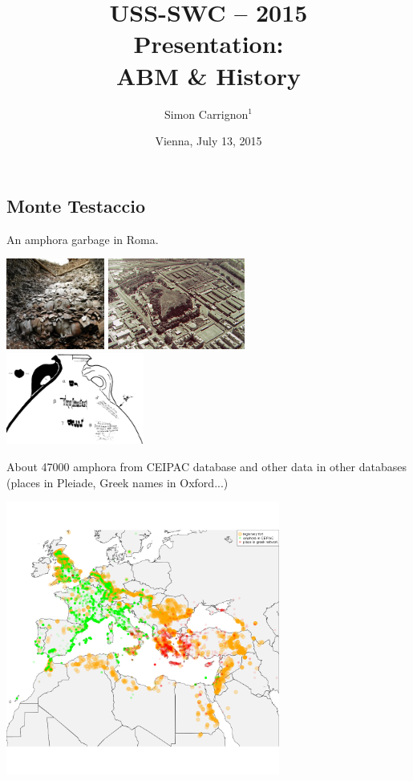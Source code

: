 \documentclass[final]{beamer}
\title{USS-SWC -- 2015\\
	Presentation:\\
	ABM \& History
}
\date{Vienna, July 13, 2015}
\author{Simon Carrignon$^1$}
\institute[]{
	$^1$Barcelona~Supercomputing~Center \\

}
\begin{document}
\begin{frame}
	\maketitle


\section{Monte Testaccio}

	An amphora garbage in Roma.\\

	\begin{center}
		\includegraphics[height=3cm]{./Mount-Testaccio.jpg}
		\hfil \includegraphics[height=3cm]{./Mount-Testaccio2.jpg}\\
		\vfill
		\includegraphics[height=3cm]{./titulus.png}

	\end{center}


	About 47000 amphora from CEIPAC database and other data in other databases (places in Pleiade, Greek names in Oxford...)

	\begin{center}
		\includegraphics[width=9cm]{./fortGreekPlaceAndAmphora.png}
	\end{center}
	


\end{frame}
\end{document}
